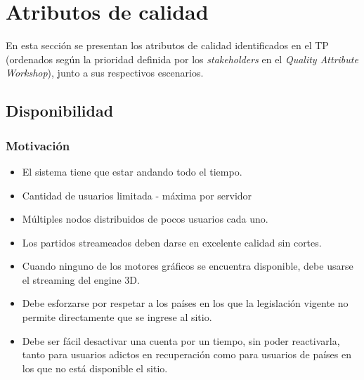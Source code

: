 \section{Atributos de calidad}

En esta sección se presentan los atributos de calidad identificados en el TP (ordenados según la prioridad definida por los \emph{stakeholders} en el \emph{Quality Attribute Workshop}), junto a sus respectivos escenarios.


\subsection{Disponibilidad}

\subsubsection*{Motivación}
\begin{itemize}
\item El sistema tiene que estar andando todo el tiempo.
\item Cantidad de usuarios limitada - máxima por servidor
\item Múltiples nodos distribuidos de pocos usuarios cada uno.
\item Los partidos streameados deben darse en excelente calidad sin cortes.
\item Cuando ninguno de los motores gráficos se encuentra disponible, debe usarse el streaming del engine 3D.
\item Debe esforzarse por respetar a los países en los que la legislación vigente no permite directamente que se ingrese al sitio.
\item Debe ser fácil desactivar una cuenta por un tiempo, sin poder reactivarla, tanto para usuarios adictos en recuperación como para usuarios de países en los que no está disponible el sitio.
\end{itemize}

